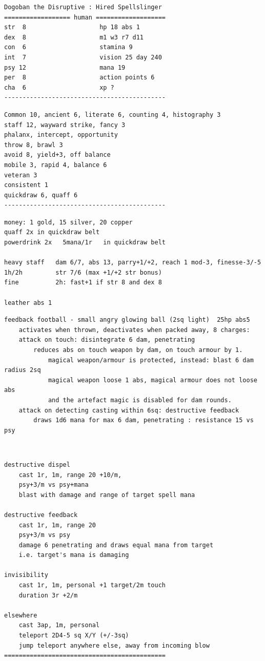 \small \begin{samepage} \begin{verbatim}
Dogoban the Disruptive : Hired Spellslinger
================== human ===================
str  8                    hp 18 abs 1
dex  8                    m1 w3 r7 d11
con  6                    stamina 9
int  7                    vision 25 day 240
psy 12                    mana 19
per  8                    action points 6
cha  6                    xp ?
--------------------------------------------
\end{verbatim} \goodbreak \begin{verbatim}
Common 10, ancient 6, literate 6, counting 4, histography 3
staff 12, wayward strike, fancy 3
phalanx, intercept, opportunity
throw 8, brawl 3
avoid 8, yield+3, off balance
mobile 3, rapid 4, balance 6
veteran 3
consistent 1
quickdraw 6, quaff 6
--------------------------------------------
\end{verbatim} \goodbreak \begin{verbatim}
money: 1 gold, 15 silver, 20 copper
quaff 2x in quickdraw belt
powerdrink 2x   5mana/1r   in quickdraw belt

heavy staff   dam 6/7, abs 13, parry+1/+2, reach 1 mod-3, finesse-3/-5
1h/2h         str 7/6 (max +1/+2 str bonus)
fine          2h: fast+1 if str 8 and dex 8

leather abs 1

\end{verbatim} \goodbreak \begin{verbatim}
feedback football - small angry glowing ball (2sq light)  25hp abs5
    activates when thrown, deactivates when packed away, 8 charges:
    attack on touch: disintegrate 6 dam, penetrating
        reduces abs on touch weapon by dam, on touch armour by 1.
            magical weapon/armour is protected, instead: blast 6 dam radius 2sq
            magical weapon loose 1 abs, magical armour does not loose abs
            and the artefact magic is disabled for dam rounds.
    attack on detecting casting within 6sq: destructive feedback
        draws 1d6 mana for max 6 dam, penetrating : resistance 15 vs psy

\end{verbatim} \end{samepage} \ \goodbreak \begin{samepage} \begin{verbatim}
destructive dispel
    cast 1r, 1m, range 20 +10/m, 
    psy+3/m vs psy+mana
    blast with damage and range of target spell mana

destructive feedback
    cast 1r, 1m, range 20
    psy+3/m vs psy
    damage 6 penetrating and draws equal mana from target
    i.e. target's mana is damaging

invisibility
    cast 1r, 1m, personal +1 target/2m touch
    duration 3r +2/m

elsewhere
    cast 3ap, 1m, personal
    teleport 2D4-5 sq X/Y (+/-3sq)
    jump teleport anywhere else, away from incoming blow
============================================
\end{verbatim} \end{samepage} \normalsize
